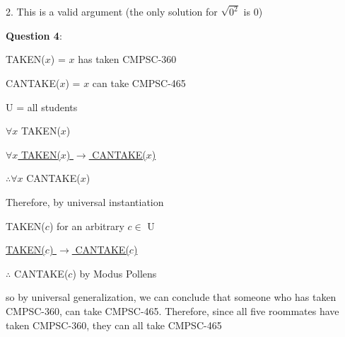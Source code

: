 \documentclass{article} %
\newcommand{\question}[2][]{\begin{flushleft}
        \textbf{Question #1}: \textit{#2}

\end{flushleft}}
\begin{document}
    2. This is a valid argument (the only solution for $\sqrt{0^2}$ is 0)

                                                                     
    \question[4]{}

    TAKEN($x$) = $x$ has taken CMPSC-360

    CANTAKE($x$) = $x$ can take CMPSC-465

    U = all students

    \vspace*{0.2cm}

    $\forall x$ TAKEN($x$)

    \underline{$\forall x$ TAKEN($x$) $\rightarrow$ CANTAKE($x$)}

    $\therefore \forall x$ CANTAKE($x$)

    \vspace*{0.2cm}
    Therefore, by universal instantiation

    TAKEN($c$) for an arbitrary $c \in$ U

    \underline{TAKEN($c$) $\rightarrow$ CANTAKE($c$)}

    $\therefore$ CANTAKE($c$) by Modus Pollens

    \vspace*{0.2cm}
    so by universal generalization, we can conclude that someone who has taken CMPSC-360, can \tabto{0.5cm} 
    take CMPSC-465. Therefore, since all five roommates have taken CMPSC-360, they can all \tabto{0.5cm}
    take CMPSC-465








\end{document}

